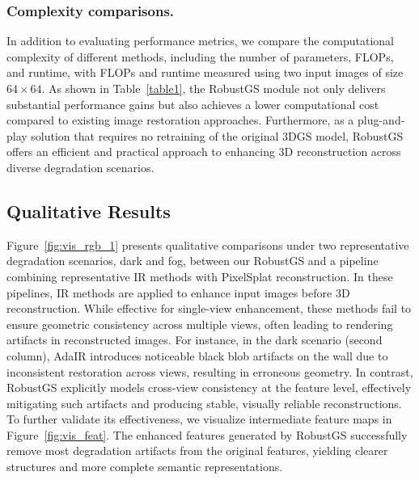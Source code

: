 \documentclass[letterpaper]{article} %
\begin{document}
\subsubsection{Complexity comparisons.}  

In addition to evaluating performance metrics, we compare the computational complexity of different methods, including the number of parameters, FLOPs, and runtime, with FLOPs and runtime measured using two input images of size $64 \times 64$. As shown in Table~\ref{table1}, the RobustGS module not only delivers substantial performance gains but also achieves a lower computational cost compared to existing image restoration approaches. Furthermore, as a plug-and-play solution that requires no retraining of the original 3DGS model, RobustGS offers an efficient and practical approach to enhancing 3D reconstruction across diverse degradation scenarios.

\subsection{Qualitative Results}



Figure~\ref{fig:vis_rgb_1} presents qualitative comparisons under two representative degradation scenarios, dark and fog, between our RobustGS and a pipeline combining representative IR methods with PixelSplat reconstruction. In these pipelines, IR methods are applied to enhance input images before 3D reconstruction. While effective for single-view enhancement, these methods fail to ensure geometric consistency across multiple views, often leading to rendering artifacts in reconstructed images. For instance, in the dark scenario (second column), AdaIR introduces noticeable black blob artifacts on the wall due to inconsistent restoration across views, resulting in erroneous geometry. In contrast, RobustGS explicitly models cross-view consistency at the feature level, effectively mitigating such artifacts and producing stable, visually reliable reconstructions. To further validate its effectiveness, we visualize intermediate feature maps in Figure~\ref{fig:vis_feat}. The enhanced features generated by RobustGS successfully remove most degradation artifacts from the original features, yielding clearer structures and more complete semantic representations.
\end{document}
